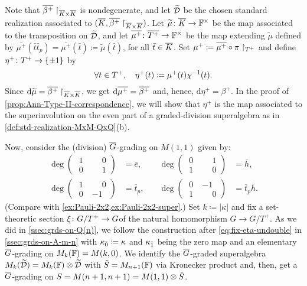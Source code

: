 Note that $\barr {\beta^+}\restriction_{\barr K \times \barr K}$ is nondegenerate, and let $\widetilde {\mathcal{D}}$ be the chosen standard realization associated to $(\barr{K}, \barr{\beta^+}\restriction_{\barr K \times \barr K})$. 
Let $ {\widetilde\mu}\from \barr{K} \to \FF^\times$ be the map associated to the transposition on $\widetilde {\mathcal{D}}$, and let $\barr{\mu^+}\from \barr{T^+} \to \FF^\times$ be the map extending $\widetilde\mu$ defined by $\overline{\mu^+}(\bar t \bar t_p) = \overline{\mu^+}(\bar t) \coloneqq \widetilde\mu (\bar t)$, for all $\bar t\in \barr K$. 
Set $\mu^+ \coloneqq \barr {\mu^+} \circ \pi\restriction_{T^+}$ and define $\eta^+\colon T^+ \to \{ \pm 1 \}$ by
\[\label{eq:fix-eta-plus-undouble-Ann}
    \forall t\in T^+, \quad \eta^+(t) \coloneqq \mu^+(t) \chi^{-1}(t).
\] 
Since $\mathrm{d} \widetilde\mu = \barr{\beta^+}\restriction_{\barr K \times \barr K}$, we get $\mathrm{d} \overline{\mu^+} = \barr{\beta^+}$ and, hence, $\mathrm{d} \eta^+ = \beta^+$.  
In the proof of \cref{prop:Ann-Type-II-correspondence}, we will show that $\eta^+$ is the map associated to the superinvolution on the even part of a graded-division superalgebra as in \cref{def:std-realization-MxM-QxQ}(b). 

Now, consider the (division) $\barr G$-grading on $M(1,1)$ given by:
%
\[\label{eq:bar-G-grd-on-M(1-1)}
\begin{aligned}
	\deg \left(\begin{array}{c|c}
		 \phantom{.}1\phantom{.} & \phantom{-}0 \\
		\hline
		 \phantom{.}0\phantom{.} & \phantom{-}1 
	\end{array}\right) &= \bar e,\quad & \deg \left(\begin{array}{c|c}
		 \phantom{.}0\phantom{.} & \phantom{-}1 \\
		\hline
		 \phantom{.}1\phantom{.} & \phantom{-}0 
	\end{array}\right) &= \bar h, \\
	\deg \left(\begin{array}{c|c}
		 \phantom{.}1\phantom{.} & \phantom{-}0 \\
		\hline
		 \phantom{.}0\phantom{.} & -1 
	\end{array}\right) &= \bar t_p,\quad &
	\deg \left(\begin{array}{c|c}
		 \phantom{.}0\phantom{.} & -1           \\
		\hline
		 \phantom{.}1\phantom{.} & \phantom{-}0 
	\end{array}\right) &= \bar t_p \bar h.
\end{aligned}
\]
(Compare with \cref{ex:Pauli-2x2,ex:Pauli-2x2-super}.) 
Set $k \coloneqq |\kappa|$ and fix a set-theoretic section $\xi\colon G/T^+ \to G$of the natural homomorphism $G \to G/T^+$. 
As we did in \cref{ssec:grds-on-Q(n)}, we follow the construction after \cref{eq:fix-eta-undouble} in \cref{ssec:grds-on-A-m-n} with $\kappa_{\bar{0}} \coloneqq \kappa$ and $\kappa_{\bar{1}}$ being the zero map and an elementary $\barr G$-grading on $M_k(\mathbb{F}) = M(k , 0)$. 
We identify the $\barr G$-graded superalgebra $M_{k}(\widetilde {\mathcal{D}}) = M_{k}(\mathbb{F}) \otimes \widetilde {\mathcal{D}}$ with $\tilde S = M_{n+1}(\mathbb{F})$ via Kronecker product and, then, get a $\barr G$-grading on $S = M(n+1, n+1) = M(1,1) \otimes \tilde S$. 

